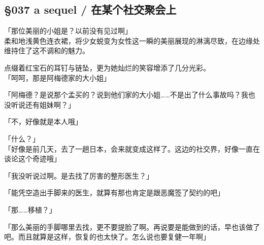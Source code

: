 \subsection{§037 a sequel / 在某个社交聚会上}

「那位美丽的小姐是？以前没有见过啊」\\

柔和地浅黄色连衣裙，将少女蜕变为女性这一瞬的美丽展现的淋漓尽致，在边缘处维持住了这不调和的魅力。

点缀着红宝石的耳钉与链坠，更为她灿烂的笑容增添了几分光彩。\\

「呵呵，那是阿梅德家的大小姐」

「阿梅德？是说那个孟买的？说到他们家的大小姐……不是出了什么事故吗？我也没听说还有姐妹啊？」

「不，好像就是本人哦」

「什么？」\\

「好像是前几天，去了一趟日本，会来就变成这样了。这边的社交界，好像一直在谈论这个奇迹哦」

「我没听说过啊。是去找了厉害的整形医生？」

「能凭空造出手脚来的医生，就算有那也肯定是跟恶魔签了契约的吧」

「那……移植？」

「那么美丽的手脚哪里去找，更不要提脸了啊。再说要是能做到的话，早也该做了吧。而且就算是这样，恢复的也太快了。怎么说也要复健一年啊」

